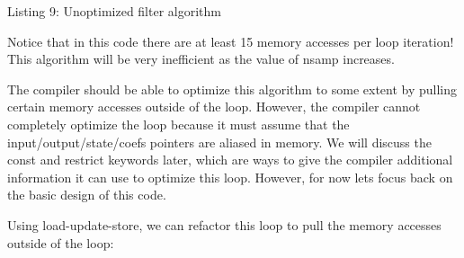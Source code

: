 \begin{DoxyCode}{0}
\DoxyCodeLine{\textcolor{keyword}{inline} \textcolor{keywordtype}{void}}
\DoxyCodeLine{\{}
\DoxyCodeLine{    \textcolor{comment}{// eB0 .. eB2 and eA0, eA1 are just integer enums to partition}}
\DoxyCodeLine{    \textcolor{comment}{// the filter coefficients into A and B}}
\DoxyCodeLine{    \{}
\DoxyCodeLine{    \}}
\DoxyCodeLine{\} }
\end{DoxyCode}
  Listing 9\+: Unoptimized filter algorithm

Notice that in this code there are at least 15 memory accesses per loop iteration! This algorithm will be very inefficient as the value of {\ttfamily nsamp} increases.

The compiler should be able to optimize this algorithm to some extent by pulling certain memory accesses outside of the loop. However, the compiler cannot completely optimize the loop because it must assume that the input/output/state/coefs pointers are aliased in memory. We will discuss the {\ttfamily const} and {\ttfamily restrict} keywords later, which are ways to give the compiler additional information it can use to optimize this loop. However, for now let\textquotesingle{}s focus back on the basic design of this code.

Using load-\/update-\/store, we can refactor this loop to pull the memory accesses outside of the loop\+:


